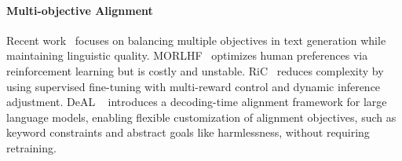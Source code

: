 \paragraph{Multi-objective Alignment}
Recent work~\cite{mudgal2023controlled} focuses on balancing multiple objectives in text generation while maintaining linguistic quality. MORLHF~\cite{zhou2023beyond, rame2024rewarded} optimizes human preferences via reinforcement learning but is costly and unstable. RiC~\cite{yang2024rewards} reduces complexity by using supervised fine-tuning with multi-reward control and dynamic inference adjustment. DeAL ~\cite{huang2024deal} introduces a decoding-time alignment framework for large language models, enabling flexible customization of alignment objectives, such as keyword constraints and abstract goals like harmlessness, without requiring retraining.
